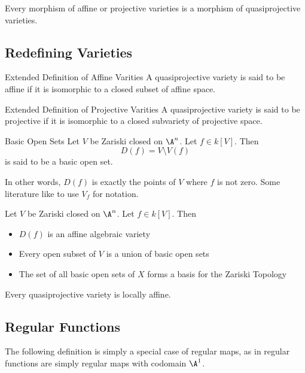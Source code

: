 \documentclass[a4paper]{article}
\begin{document}
\begin{lmm}{}{} Every morphism of affine or projective varieties is a morphism of quasiprojective varieties. 
\end{lmm}

\subsection{Redefining Varieties}
\begin{defn}{Extended Definition of Affine Varities}{} A quasiprojective variety is said to be affine if it is isomorphic to a closed subset of affine space. 
\end{defn}

\begin{defn}{Extended Definition of Projective Varities}{} A quasiprojective variety is said to be projective if it is isomorphic to a closed subvariety of projective space. 
\end{defn}

\begin{defn}{Basic Open Sets}{} Let $V$ be Zariski closed on $\A^n$. Let $f\in k[V]$. Then $$D(f)=V\setminus V(f)$$ is said to be a basic open set. 
\end{defn}

In other words, $D(f)$ is exactly the points of $V$ where $f$ is not zero. Some literature like to use $V_f$ for notation. 

\begin{prp}{}{} Let $V$ be Zariski closed on $\A^n$. Let $f\in k[V]$. Then 
\begin{itemize}
\item $D(f)$ is an affine algebraic variety
\item Every open subset of $V$ is a union of basic open sets
\item The set of all basic open sets of $X$ forms a basis for the Zariski Topology
\end{itemize}
\end{prp}

\begin{prp}{}{} Every quasiprojective variety is locally affine. 
\end{prp}

\subsection{Regular Functions}
The following definition is simply a special case of regular maps, as in regular functions are simply regular maps with codomain $\A^1$. 
\end{document}
